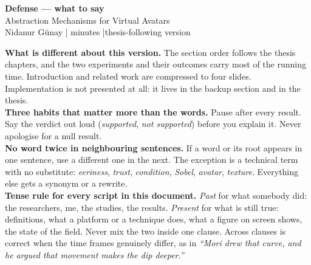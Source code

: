 \documentclass[11pt,a4paper]{article}
\begin{document}
\begin{center}
  {\LARGE\bfseries\color{knblue} Defense — what to say}\\[0.4em]
  {\large Abstraction Mechanisms for Virtual Avatars}\\[0.3em]
  {\color{kngrey} Nidanur Günay \quad| minutes \quad|\quad thesis-following version}
\end{center}

\vspace{0.6em}

\noindent\colorbox{knlight}{\parbox{0.972\textwidth}{\small\color{knblue}
\textbf{What is different about this version.} The section order follows the thesis chapters, and the two experiments and their outcomes carry most of the running time. Introduction and related work are compressed to four slides. Implementation is not presented at all: it lives in the backup section and in the thesis.\\[0.4em]
\textbf{Three habits that matter more than the words.} Pause after every result. Say the verdict out loud (\emph{supported}, \emph{not supported}) before you explain it. Never apologise for a null result.\\[0.4em]
\textbf{No word twice in neighbouring sentences.} If a word or its root appears in one sentence, use a different one in the next. The exception is a technical term with no substitute: \emph{eeriness}, \emph{trust}, \emph{condition}, \emph{Sobel}, \emph{avatar}, \emph{texture}. Everything else gets a synonym or a rewrite.\\[0.4em]
\textbf{Tense rule for every script in this document.} \emph{Past} for what somebody did: the researchers, me, the studies, the results. \emph{Present} for what is still true: definitions, what a platform or a technique does, what a figure on screen shows, the state of the field. Never mix the two inside one clause. Across clauses is correct when the time frames genuinely differ, as in \emph{``Mori drew that curve, and he argued that movement makes the dip deeper.''}}}

\vspace{0.9em}
\end{document}
